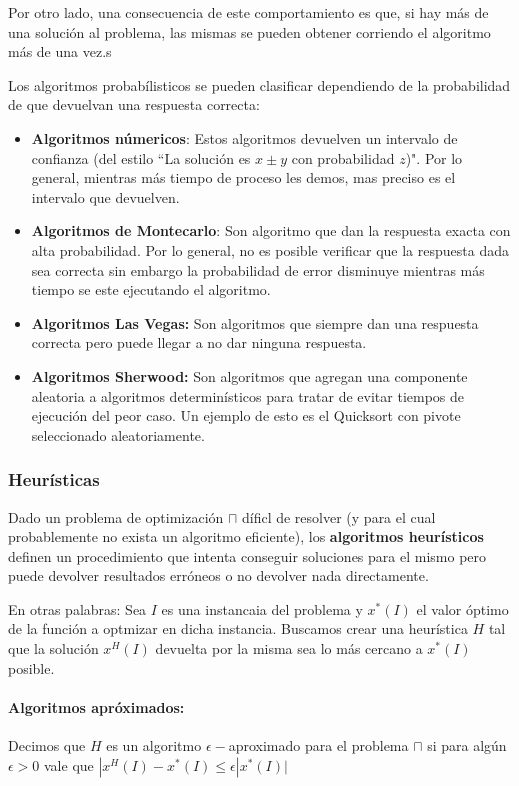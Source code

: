Por otro lado, una consecuencia de este comportamiento es que, si hay más de una solución al problema, las mismas se pueden obtener corriendo el algoritmo más de una vez.s

Los algoritmos probabílisticos se pueden clasificar dependiendo de la probabilidad de que devuelvan una respuesta correcta:

\begin{itemize}
	\item \textbf{Algoritmos númericos}: Estos algoritmos devuelven un intervalo de confianza (del estilo ``La solución es \( x \pm y\) con probabilidad \(z\))". Por lo general, mientras más tiempo de proceso les demos, mas preciso es el intervalo que devuelven.
	\item \textbf{Algoritmos de Montecarlo}: Son algoritmo que dan la respuesta exacta con alta probabilidad. Por lo general, no es posible verificar que la respuesta dada sea correcta sin embargo la probabilidad de error disminuye mientras más tiempo se este ejecutando el algoritmo.
	\item \textbf{Algoritmos Las Vegas:} Son algoritmos que siempre dan una respuesta correcta pero puede llegar a no dar ninguna respuesta. 
	\item \textbf{Algoritmos Sherwood:} Son algoritmos que agregan una componente aleatoria a algoritmos determinísticos para tratar de evitar tiempos de ejecución del peor caso. Un ejemplo de esto es el Quicksort con pivote seleccionado aleatoriamente.
\end{itemize}

\subsubsection{Heurísticas}
Dado un problema de optimización \(\sqcap\) díficl de resolver (y para el cual probablemente no exista un algoritmo eficiente), los \textbf{algoritmos heurísticos} definen un procedimiento que intenta conseguir soluciones para el mismo pero puede devolver resultados erróneos o no devolver nada directamente.

En otras palabras: Sea \(I\) es una instancaia del problema y \(x^*(I)\) el valor óptimo de la función a optmizar en dicha instancia. Buscamos crear una heurística \(H\) tal que la solución \(x^H(I)\) devuelta por la misma sea lo más cercano a \(x^*(I)\) posible.

\paragraph{Algoritmos apróximados:} Decimos que \(H\) es un algoritmo \(\epsilon-\)aproximado para el problema \(\sqcap\) si para algún \(\epsilon > 0\) vale que \(|x^H(I) - x^*(I)\leq\epsilon|x^*(I)|\)

